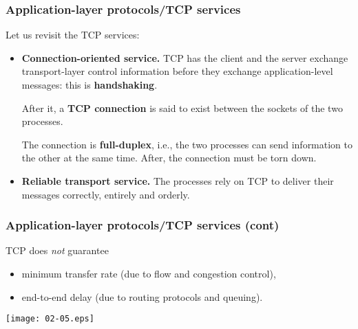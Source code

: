 %
\begin{frame}
\frametitle{Application-layer protocols/TCP services}

Let us revisit the TCP services:
\begin{itemize}

  \item \textbf{Connection-oriented service.} TCP has the client and
    the server exchange transport\hyp{}layer control information
    before they exchange application\hyp{}level messages: this is
    \textbf{handshaking}.

  After it, a \textbf{TCP connection} is said to exist between the
  sockets of the two processes. 

  The connection is \textbf{full-duplex}, i.e., the two processes can
  send information to the other at the same time. After, the
  connection must be torn down.

  \item \textbf{Reliable transport service.} The processes rely on
  TCP to deliver their messages correctly, entirely and orderly.

\end{itemize}

\end{frame}

%
\begin{frame}
\frametitle{Application-layer protocols/TCP services (cont)}

TCP does \emph{not} guarantee
\begin{itemize}

  \item minimum transfer rate (due to flow and congestion control),

  \item end-to-end delay (due to routing protocols and queuing).

\end{itemize}
\begin{center}
\texttt{[image: 02-05.eps]}
\end{center}

\end{frame}
